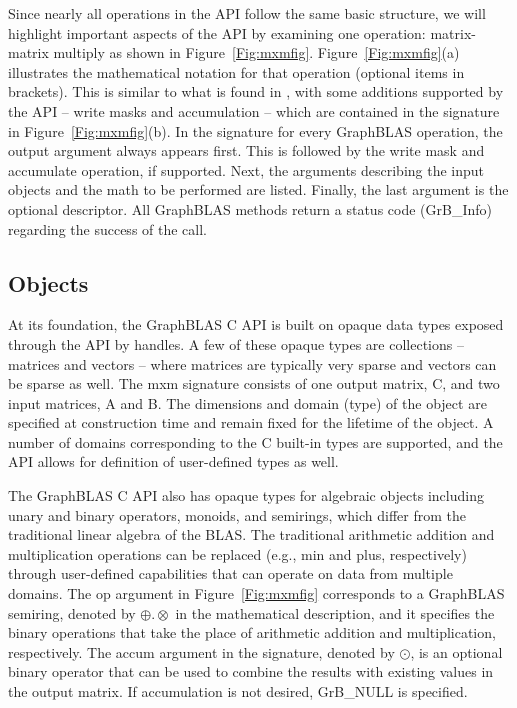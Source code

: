 Since nearly all operations in the API follow the same basic structure, we will
highlight important aspects of the API by examining one operation: matrix-matrix
multiply as shown in Figure~\ref{Fig:mxmfig}.  Figure~\ref{Fig:mxmfig}(a) illustrates
the mathematical notation for that operation (optional items in brackets). This is similar to what is found in
\cite{mathgraphblas16}, with some additions supported by the API -- write masks and
accumulation -- which are contained in the signature in Figure~\ref{Fig:mxmfig}(b).
In the signature for every GraphBLAS operation, the output argument always 
appears first. This is followed by the write mask and accumulate operation, if supported. 
Next, the arguments describing the input objects and the math to be performed are
listed. Finally, the last argument is the optional descriptor.  All GraphBLAS methods
return a status code ({\sf GrB\_Info}) regarding the success of the call.

\subsection{Objects}

At its foundation, the GraphBLAS C API is built on opaque data types exposed
through the API by handles.  
A few of these opaque types are collections -- matrices and vectors --
where matrices are typically very sparse and vectors can be
sparse as well.  The {\sf mxm} signature consists of one output matrix, {\sf C}, and 
two input matrices, {\sf A} and {\sf B}. The dimensions and 
domain (type) of the object are specified at construction time and remain fixed for the lifetime of 
the object.  A number of domains corresponding to the C built-in types are
supported, and the API allows for definition of user-defined types as well.

The GraphBLAS C API also has opaque types for algebraic objects including
unary and binary operators, monoids, and semirings, which differ from the traditional
linear algebra of the BLAS.  The traditional arithmetic addition and
multiplication operations can be replaced (e.g., min and plus, respectively) through
user-defined capabilities that can operate on data from multiple domains.  The {\sf op} 
argument in Figure~\ref{Fig:mxmfig} corresponds to a GraphBLAS semiring, denoted by $\oplus.\otimes$ in the 
mathematical description, and it specifies the binary operations that take the 
place of arithmetic addition and multiplication, respectively. The {\sf accum}
argument in the signature, denoted by $\odot$, is an optional binary operator that can
be used to combine the results with existing values in the output matrix. If accumulation
is not desired, {\sf GrB\_NULL} is specified.

